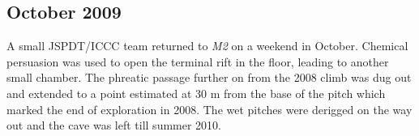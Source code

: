 \subsection{October 2009}

A small JSPDT/ICCC team returned to \emph{M2} on a weekend in October.
Chemical persuasion was used to open the terminal rift in the floor,
leading to another small chamber. The phreatic passage further on from
the 2008 climb was dug out and extended to a point estimated at 30 m
from the base of the pitch which marked the end of exploration in 2008.
The wet pitches were derigged on the way out and the cave was left till
summer 2010.
